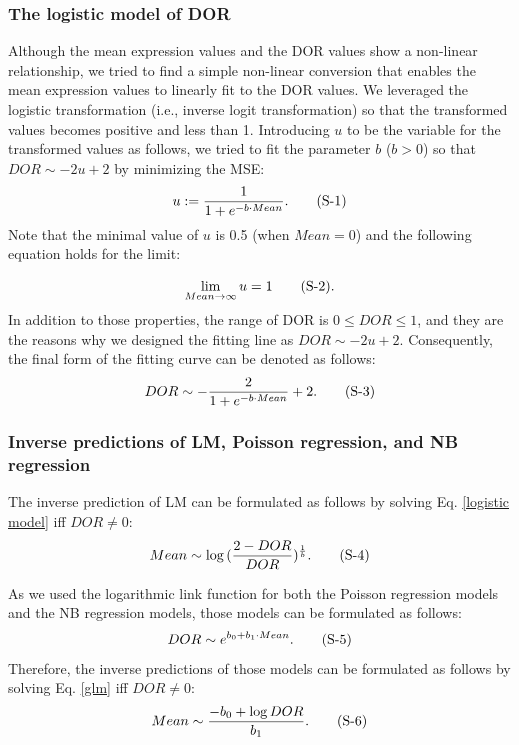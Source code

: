 \documentclass{article}
\begin{document}
\subsubsection*{
  The logistic model of DOR
}
Although the mean expression values and the DOR values show a non-linear relationship, we tried to find a simple 
non-linear conversion that enables the mean expression values to linearly fit to the DOR values. We leveraged the 
logistic transformation (i.e., inverse logit transformation) so that the transformed values becomes positive and less 
than 1. Introducing $u$ to be the variable for the transformed values as follows, we tried to fit the parameter $b$ ($b>0$) 
so that $DOR\sim -2u + 2$ by minimizing the MSE:
\begin{equation}\label{logistic transformation}
  u := \frac{1}{1+e^{-b\cdot Mean}}.
  \stepcounter{equation} \tag{S-\theequation}
\end{equation}
Note that the minimal value of $u$ is 0.5 (when $Mean=0$) and the following equation holds for the limit:

\begin{equation}\label{lim}
  \lim_{Mean\rightarrow\infty}u=1
  \stepcounter{equation} \tag{S-\theequation}.
\end{equation}
In addition to those properties, the range of DOR is $0\leq DOR\leq 1$, and they are the reasons why we designed the 
fitting line as $DOR\sim -2u + 2$. Consequently, the final form of the fitting curve can be denoted as follows:
\begin{equation}\label{logistic model}
  DOR\sim -\frac{2}{1+e^{-b\cdot Mean}}+2.
  \stepcounter{equation} \tag{S-\theequation}
\end{equation}

\subsubsection*{Inverse predictions of LM, Poisson regression, and NB regression}
The inverse prediction of LM can be formulated as follows by solving Eq. \eqref{logistic model} iff $DOR\neq 0$:
\begin{equation}\label{inverse lm}
  Mean\sim\log{(\frac{2-DOR}{DOR})^\frac{1}{b}}.
  \stepcounter{equation} \tag{S-\theequation}
\end{equation}

As we used the logarithmic link function for both the Poisson regression models and the NB regression models, 
those models can be formulated as follows:
\begin{equation}\label{glm}
  DOR\sim e^{b_0+b_1\cdot Mean}.
  \stepcounter{equation} \tag{S-\theequation}
\end{equation}
Therefore, the inverse predictions of those models can be formulated as follows by solving Eq. \eqref{glm} iff $DOR\neq 0$:
\begin{equation}\label{inverse glm}
  Mean\sim\frac{-b_0+\log{DOR}}{b_1}.
  \stepcounter{equation} \tag{S-\theequation}
\end{equation}
\end{document}
